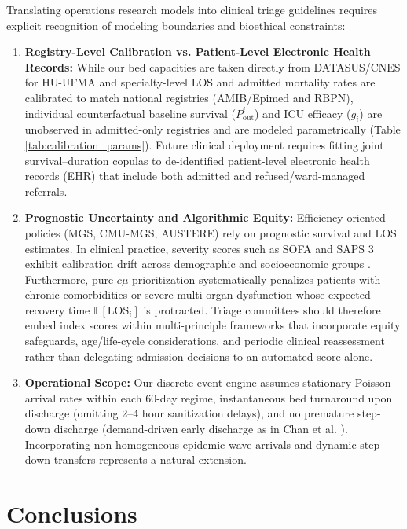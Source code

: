 \documentclass[final,5p,times,twocolumn]{elsarticle}
\begin{document}
Translating operations research models into clinical triage guidelines requires explicit recognition of modeling boundaries and bioethical constraints:
\begin{enumerate}[(1)]
    \item \textbf{Registry-Level Calibration vs. Patient-Level Electronic Health Records:} While our bed capacities are taken directly from DATASUS/CNES for HU-UFMA and specialty-level LOS and admitted mortality rates are calibrated to match national registries (AMIB/Epimed and RBPN), individual counterfactual baseline survival ($P_{\text{out}}^i$) and ICU efficacy ($g_i$) are unobserved in admitted-only registries and are modeled parametrically (Table \ref{tab:calibration_params}). Future clinical deployment requires fitting joint survival--duration copulas to de-identified patient-level electronic health records (EHR) that include both admitted and refused/ward-managed referrals.
    \item \textbf{Prognostic Uncertainty and Algorithmic Equity:} Efficiency-oriented policies (MGS, CMU-MGS, AUSTERE) rely on prognostic survival and LOS estimates. In clinical practice, severity scores such as SOFA and SAPS 3 exhibit calibration drift across demographic and socioeconomic groups \cite{White_2021, aquino2022ethical}. Furthermore, pure $c\mu$ prioritization systematically penalizes patients with chronic comorbidities or severe multi-organ dysfunction whose expected recovery time $\mathbb{E}[\text{LOS}_i]$ is protracted. Triage committees should therefore embed index scores within multi-principle frameworks \cite{White_2021} that incorporate equity safeguards, age/life-cycle considerations, and periodic clinical reassessment rather than delegating admission decisions to an automated score alone.
    \item \textbf{Operational Scope:} Our discrete-event engine assumes stationary Poisson arrival rates within each 60-day regime, instantaneous bed turnaround upon discharge (omitting 2--4 hour sanitization delays), and no premature step-down discharge (demand-driven early discharge as in Chan et al. \cite{chan2012optimizing}). Incorporating non-homogeneous epidemic wave arrivals and dynamic step-down transfers represents a natural extension.
\end{enumerate}

\section{Conclusions}
\label{sec:conclusion}
\end{document}
